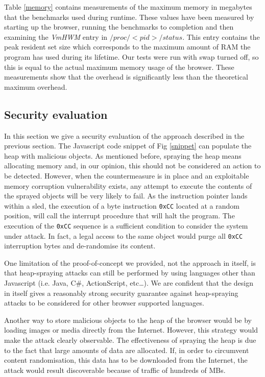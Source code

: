 Table \ref{memory} contains measurements of the maximum memory in megabytes that the benchmarks used during  runtime. These values have been measured by starting up the browser, running the benchmarks to completion and then examining the \emph{VmHWM} entry in $/proc/<pid>/status$.
This entry contains the peak resident set size which corresponds to the maximum amount of RAM the program has used during its lifetime. Our tests were run with swap turned off, so this is equal to the actual maximum memory usage of the browser. These measurements show that the overhead  is significantly less than the theoretical maximum overhead.

\subsection{Security evaluation}
In this section we give a security evaluation of the approach described in the previous section. 
The Javascript code snippet of Fig \ref{snippet} can populate the heap with malicious objects. As mentioned before, spraying the heap means allocating memory and, in our opinion, this should not be considered an action to be detected. 
However, when the countermeasure is in place and an exploitable memory corruption vulnerability exists, any attempt to execute the contents of the sprayed objects will be very likely to fail. 
As the instruction pointer lands within a sled, the execution of a byte instruction \texttt{0xCC} located at a random position, will call the interrupt procedure that will halt the program. The execution of the \texttt{0xCC} sequence is a sufficient condition to consider the system under attack. In fact, a legal access to the same object would purge all \texttt{0xCC} interruption bytes and de-randomise its content.

One limitation of the proof-of-concept we provided, not the approach in itself, is that heap-spraying attacks can still be performed by using languages other than Javascript (i.e. Java, C\#, ActionScript, etc\dots). 
We are confident that the design in itself gives a reasonably strong security guarantee against heap-spraying attacks to be considered for other browser supported languages.

Another way to store malicious objects to the heap of the browser would be by loading images or media directly from the Internet. However, this strategy would make the attack clearly observable. The effectiveness of spraying the heap is due to the fact that large amounts of data are allocated. If, in order to circumvent content randomisation, this data has to be downloaded from the Internet, the attack would result discoverable because of traffic of hundreds of MBs. 

